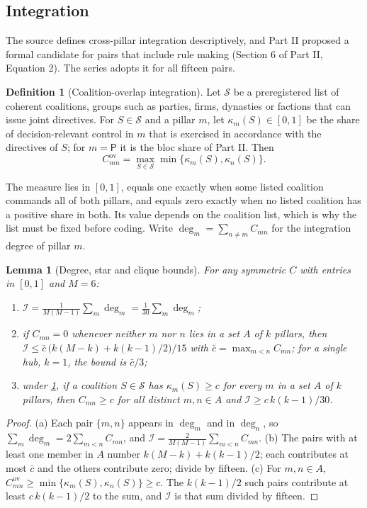 \documentclass[11pt,letterpaper]{article}
\newtheorem{lemma}[theorem]{Lemma}
\theoremstyle{definition}
\newtheorem{definition}[theorem]{Definition}
\theoremstyle{remark}
\newcommand{\pP}{\mathsf{P}}
\newcommand{\Integ}{\mathcal{I}}
\newcommand{\ov}{\mathrm{ov}}
\begin{document}
\subsection{Integration}

The source defines cross-pillar integration descriptively, and Part II proposed a formal candidate for pairs that include rule making (Section 6 of Part II, Equation 2). The series adopts it for all fifteen pairs.

\begin{definition}[Coalition-overlap integration]
\label{def:formalized-state:overlap}
Let $\mathcal{S}$ be a preregistered list of coherent coalitions, groups such as parties, firms, dynasties or factions that can issue joint directives. For $S\in\mathcal{S}$ and a pillar $m$, let $\kappa_m(S)\in[0,1]$ be the share of decision-relevant control in $m$ that is exercised in accordance with the directives of $S$; for $m=\pP$ it is the bloc share of Part II. Then
\[
C^{\ov}_{mn}=\max_{S\in\mathcal{S}}\min\{\kappa_m(S),\kappa_n(S)\}.
\]
\end{definition}

The measure lies in $[0,1]$, equals one exactly when some listed coalition commands all of both pillars, and equals zero exactly when no listed coalition has a positive share in both. Its value depends on the coalition list, which is why the list must be fixed before coding. Write $\deg_m=\sum_{n\neq m}C_{mn}$ for the integration degree of pillar $m$.

\begin{lemma}[Degree, star and clique bounds]
\label{lem:formalized-state:hub}
For any symmetric $C$ with entries in $[0,1]$ and $M=6$:
\begin{enumerate}[label=(\alph*)]
\item $\Integ=\frac{1}{M(M-1)}\sum_{m}\deg_m=\frac{1}{30}\sum_m\deg_m$;
\item if $C_{mn}=0$ whenever neither $m$ nor $n$ lies in a set $A$ of $k$ pillars, then $\Integ\le\bar c\,\bigl(k(M-k)+k(k-1)/2\bigr)/15$ with $\bar c=\max_{m<n}C_{mn}$; for a single hub, $k=1$, the bound is $\bar c/3$;
\item under \cref{def:formalized-state:overlap}, if a coalition $S\in\mathcal{S}$ has $\kappa_m(S)\ge c$ for every $m$ in a set $A$ of $k$ pillars, then $C_{mn}\ge c$ for all distinct $m,n\in A$ and $\Integ\ge c\,k(k-1)/30$.
\end{enumerate}
\end{lemma}

\begin{proof}
(a) Each pair $\{m,n\}$ appears in $\deg_m$ and in $\deg_n$, so $\sum_m\deg_m=2\sum_{m<n}C_{mn}$, and $\Integ=\frac{2}{M(M-1)}\sum_{m<n}C_{mn}$. (b) The pairs with at least one member in $A$ number $k(M-k)+k(k-1)/2$; each contributes at most $\bar c$ and the others contribute zero; divide by fifteen. (c) For $m,n\in A$, $C^{\ov}_{mn}\ge\min\{\kappa_m(S),\kappa_n(S)\}\ge c$. The $k(k-1)/2$ such pairs contribute at least $c\,k(k-1)/2$ to the sum, and $\Integ$ is that sum divided by fifteen.
\end{proof}
\end{document}
